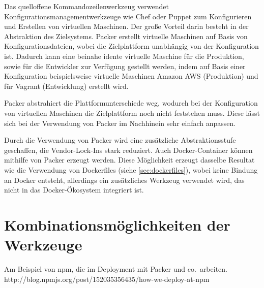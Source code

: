 Das quelloffene Kommandozeilenwerkzeug verwendet Konfigurationsmanagementwerkzeuge wie Chef oder Puppet zum Konfigurieren und Erstellen von virtuellen Maschinen.
Der große Vorteil darin besteht in der Abstraktion des Zielsystems.
Packer erstellt virtuelle Maschinen auf Basis von Konfigurationsdateien, wobei die Zielplattform unabhängig von der Konfiguration ist.
Dadurch kann eine beinahe idente virtuelle Maschine für die Produktion, sowie für die Entwickler zur Verfügung gestellt werden, indem auf Basis einer Konfiguration beispielsweise virtuelle Maschinen Amazon AWS (Produktion) und für Vagrant (Entwicklung) erstellt wird.

Packer abstrahiert die Plattformunterschiede weg, wodurch bei der Konfiguration von virtuellen Maschinen die Zielplattform noch nicht feststehen muss.
Diese lässt sich bei der Verwendung von Packer im Nachhinein sehr einfach anpassen.

Durch die Verwendung von Packer wird eine zusätzliche Abstraktionsstufe geschaffen, die Vendor-Lock-Ins stark reduziert.
Auch Docker-Container können mithilfe von Packer erzeugt werden.
Diese Möglichkeit erzeugt dasselbe Resultat wie die Verwendung von Dockerfiles (siehe \cref{sec:dockerfiles}), wobei keine Bindung an Docker entsteht, allerdings ein zusätzliches Werkzeug verwendet wird, das nicht in das Docker-Ökosystem integriert ist.


\section{Kombinationsmöglichkeiten der Werkzeuge}
\label{sec:werkzeugkombinationsmoeglichkeiten}
Am Beispiel von npm, die im Deployment mit Packer und co.\ arbeiten.
http://blog.npmjs.org/post/152035356435/how-we-deploy-at-npm
